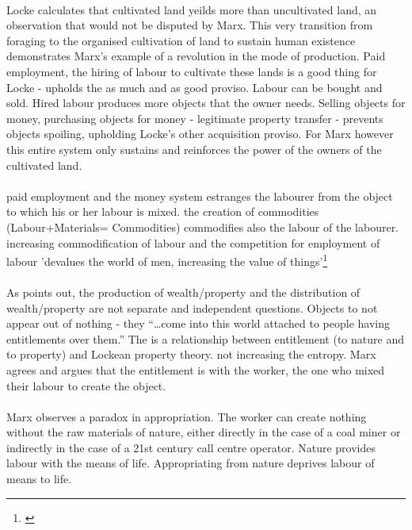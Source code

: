 \paragraph{}Locke calculates that cultivated land yeilds more than uncultivated land, an observation that would not be disputed by Marx. This very transition from foraging to the organised cultivation of land to sustain human existence demonstrates Marx's example of a revolution in the mode of production. Paid employment, the hiring of labour to cultivate these lands is a good thing for Locke - upholds the as much and as good proviso. Labour can be bought and sold. Hired labour produces more objects that the owner needs. Selling objects for money, purchasing objects for money - legitimate property transfer - prevents objects spoiling, upholding Locke's other acquisition proviso. For Marx however this entire system only sustains and reinforces the power of the owners of the cultivated land.

\paragraph{}paid employment and the money system estranges the labourer from the object to which his or her labour is mixed. the creation of commodities (Labour+Materials= Commodities) commodifies also the labour of the labourer. increasing commodification of labour and the competition for employment of labour 'devalues the world of men, increasing the value of things'\footnote{\cite[pp. 71]{Marx:1844qf}}

\paragraph{}As  points out, the production of wealth/property and the distribution of wealth/property are not separate and independent questions. Objects to not appear out of nothing - they ``\ldots come into this world attached to people having entitlements over them.'' The is a relationship between entitlement (to nature and to property) and Lockean property theory. not increasing the entropy. Marx agrees and argues that the entitlement is with the worker, the one who mixed their labour to create the object.

\paragraph{}Marx observes a paradox in appropriation. The worker can create nothing without the raw materials of nature, either directly in the case of a coal miner or indirectly in the case of a 21st century call centre operator. Nature provides labour with the means of life. Appropriating from nature deprives labour of means to life.

